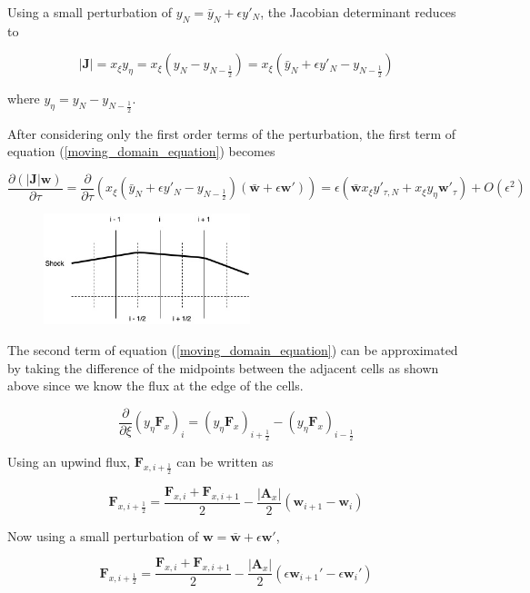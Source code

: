 \documentclass[10pt]{article}
\begin{document}
	Using a small perturbation of $y_N = \bar{y}_N + \epsilon y'_N$, the Jacobian determinant reduces to
	
	$$ |\mathbf{J}| = x_\xi y_\eta = x_\xi (y_N - y_{N-\frac{1}{2}}) = x_\xi (\bar{y}_N + \epsilon y'_N - y_{N-\frac{1}{2}}) $$
	
	where $y_\eta = y_N - y_{N-\frac{1}{2}}$.
	
	After considering only the first order terms of the perturbation, the first term of equation (\ref{moving_domain_equation}) becomes
	
	\begin{equation} \label{moving_domain_equation_term1}
		\frac{\partial (|\mathbf{J}| \mathbf{w})}{\partial \tau} = \frac{\partial}{\partial \tau} (x_\xi (\bar{y}_N + \epsilon y'_N - y_{N-\frac{1}{2}}) (\bar{\mathbf{w}} + \epsilon \mathbf{w}')) = \epsilon \left( \bar{\mathbf{w}} x_\xi y'_{\tau,N} + x_\xi y_\eta  \mathbf{w}'_{\tau} \right) + O(\epsilon^2)
	\end{equation}
	
	\begin{figure}[h]
		\includegraphics[width=6cm]{shock_point_x}
		\centering
	\end{figure}
	
	The second term of equation (\ref{moving_domain_equation}) can be approximated by taking the difference of the midpoints between the adjacent cells as shown above since we know the flux at the edge of the cells.
	
	$$ \frac{\partial}{\partial \xi} (y_\eta \mathbf{F}_x)_i =  (y_\eta \mathbf{F}_x)_{i+\frac{1}{2}} - (y_\eta \mathbf{F}_x)_{i-\frac{1}{2}} $$
	
	Using an upwind flux, $\mathbf{F}_{x,i+\frac{1}{2}}$ can be written as
	
	$$ \mathbf{F}_{x,i+\frac{1}{2}} = \frac{\mathbf{F}_{x,i} + \mathbf{F}_{x,i+1}}{2} - \frac{|\mathbf{A}_x|}{2}(\mathbf{w}_{i+1} - \mathbf{w}_{i})$$
	
	Now using a small perturbation of $\mathbf{w} = \bar{\mathbf{w}} + \epsilon \mathbf{w}'$, 
	
	$$ \mathbf{F}_{x,i+\frac{1}{2}} = \frac{\mathbf{F}_{x,i} + \mathbf{F}_{x,i+1}}{2} - \frac{|\mathbf{A}_x|}{2} (\epsilon \mathbf{w}_{i+1}' - \epsilon \mathbf{w}_i')$$
	
\end{document}
